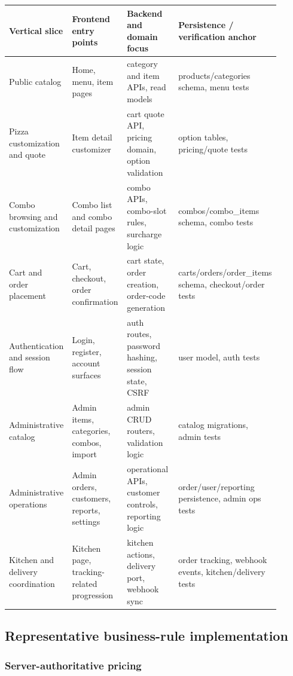 \begingroup
\footnotesize
\setlength{\LTpre}{0.4em}
\setlength{\LTpost}{0.8em}
\label{tab:application-slices}
\begin{tabular}{L{0.15\linewidth} L{0.22\linewidth} L{0.27\linewidth} L{0.26\linewidth}}
\toprule
\textbf{Vertical slice} & \textbf{Frontend entry points} & \textbf{Backend and domain focus} & \textbf{Persistence / verification anchor} \\
\midrule
Public catalog & Home, menu, item pages & category and item APIs, read models & products/categories schema, menu tests \\
Pizza customization and quote & Item detail customizer & cart quote API, pricing domain, option validation & option tables, pricing/quote tests \\
Combo browsing and customization & Combo list and combo detail pages & combo APIs, combo-slot rules, surcharge logic & combos/combo\_items schema, combo tests \\
Cart and order placement & Cart, checkout, order confirmation & cart state, order creation, order-code generation & carts/orders/order\_items schema, checkout/order tests \\
Authentication and session flow & Login, register, account surfaces & auth routes, password hashing, session state, CSRF & user model, auth tests \\
Administrative catalog & Admin items, categories, combos, import & admin CRUD routers, validation logic & catalog migrations, admin tests \\
Administrative operations & Admin orders, customers, reports, settings & operational APIs, customer controls, reporting logic & order/user/reporting persistence, admin ops tests \\
Kitchen and delivery coordination & Kitchen page, tracking-related progression & kitchen actions, delivery port, webhook sync & order tracking, webhook events, kitchen/delivery tests \\
\bottomrule
\end{tabular}
\endgroup

\subsection{Representative business-rule implementation}

\subsubsection{Server-authoritative pricing}

